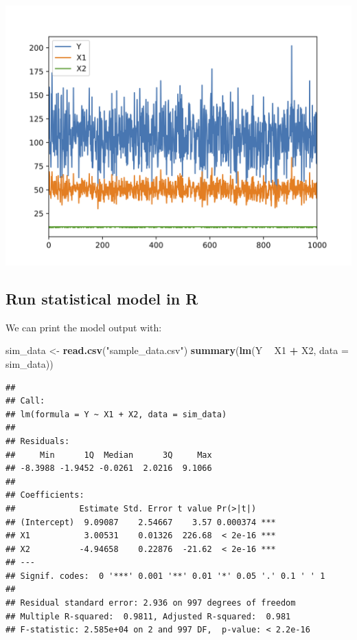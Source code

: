 \documentclass[]{book}
\newenvironment{Shaded}{\begin{snugshade}}{\end{snugshade}}
\newcommand{\KeywordTok}[1]{\textcolor[rgb]{0.13,0.29,0.53}{\textbf{#1}}}
\newcommand{\DataTypeTok}[1]{\textcolor[rgb]{0.13,0.29,0.53}{#1}}
\newcommand{\StringTok}[1]{\textcolor[rgb]{0.31,0.60,0.02}{#1}}
\newcommand{\OperatorTok}[1]{\textcolor[rgb]{0.81,0.36,0.00}{\textbf{#1}}}
\newcommand{\NormalTok}[1]{#1}
\theoremstyle{definition}
\theoremstyle{definition}
\theoremstyle{definition}
\theoremstyle{remark}
\begin{document}
\includegraphics{images/ch1_plot.jpg}

\subsection{Run statistical model in
R}\label{run-statistical-model-in-r}

We can print the model output with:

\begin{Shaded}
\begin{Highlighting}[]
\NormalTok{sim_data <-}\StringTok{ }\KeywordTok{read.csv}\NormalTok{(}\StringTok{"sample_data.csv"}\NormalTok{)}
\KeywordTok{summary}\NormalTok{(}\KeywordTok{lm}\NormalTok{(Y }\OperatorTok{~}\StringTok{ }\NormalTok{X1 }\OperatorTok{+}\StringTok{ }\NormalTok{X2, }\DataTypeTok{data =}\NormalTok{ sim_data))}
\end{Highlighting}
\end{Shaded}

\begin{verbatim}
## 
## Call:
## lm(formula = Y ~ X1 + X2, data = sim_data)
## 
## Residuals:
##     Min      1Q  Median      3Q     Max 
## -8.3988 -1.9452 -0.0261  2.0216  9.1066 
## 
## Coefficients:
##             Estimate Std. Error t value Pr(>|t|)    
## (Intercept)  9.09087    2.54667    3.57 0.000374 ***
## X1           3.00531    0.01326  226.68  < 2e-16 ***
## X2          -4.94658    0.22876  -21.62  < 2e-16 ***
## ---
## Signif. codes:  0 '***' 0.001 '**' 0.01 '*' 0.05 '.' 0.1 ' ' 1
## 
## Residual standard error: 2.936 on 997 degrees of freedom
## Multiple R-squared:  0.9811, Adjusted R-squared:  0.981 
## F-statistic: 2.585e+04 on 2 and 997 DF,  p-value: < 2.2e-16
\end{verbatim}
\end{document}

